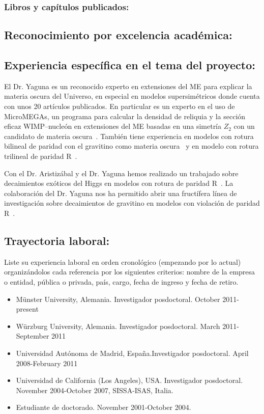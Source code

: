 \subsubsection{Libros y capítulos publicados:}
\subsection{Reconocimiento por excelencia académica:}
\subsection{Experiencia específica en el tema del proyecto:}
El Dr. Yaguna es un reconocido experto en extensiones del ME para
explicar la materia oscura del Universo, en especial en modelos
supersimétricos donde cuenta con unos 20 artículos publicados. En
particular es un experto en el uso de MicroMEGAs, un programa para
calcular la densidad de reliquia y la sección eficaz WIMP--nucleón en
extensiones del ME basadas en una simetría $Z_2$ con un candidato de
materia oscura~\cite{Yaguna:2011qn,LopezHonorez:2010tb,Honorez:2010re,Choi:2009qc,Yaguna:2008hd,Goudelis:2009zz}. También tiene experiencia en modelos con rotura
bilineal de paridad con el gravitino como materia oscura~\cite{Choi:2010jt,Choi:2010xn} y en modelo con rotura trilineal de paridad R~\cite{AristizabalSierra:2008ye}. 

Con el Dr. Aristizábal y el Dr. Yaguna hemos realizado un trabajado
sobre decaimientos exóticos del Higgs en modelos con rotura de paridad
R~\cite{AristizabalSierra:2008ye}.  La colaboración del Dr. Yaguna nos
ha permitido abrir una fructífera línea de investigación sobre
decaimientos de gravitino en modelos con violación de paridad
R~\cite{Choi:2010jt}.
\subsection{Trayectoria laboral:}
\begin{instrucciones}
  Liste su experiencia laboral en orden cronológico (empezando por lo
  actual) organizándolos cada referencia por los siguientes criterios:
  nombre de la empresa o entidad, pública o privada, país, cargo,
  fecha de ingreso y fecha de retiro.
\end{instrucciones}
\begin{itemize}
\item M\"unster University, Alemania. Investigador posdoctoral. October 2011-present

\item W\"urzburg University, Alemania. Investigador posdoctoral. March 2011-September 2011

\item Universidad Autónoma de Madrid, España.Investigador posdoctoral. April 2008-February 2011

\item Universidad de California (Los Angeles), USA. Investigador posdoctoral. November 2004-October 2007, SISSA-ISAS, Italia. 

\item Estudiante de doctorado. November 2001-October 2004.

\end{itemize}
